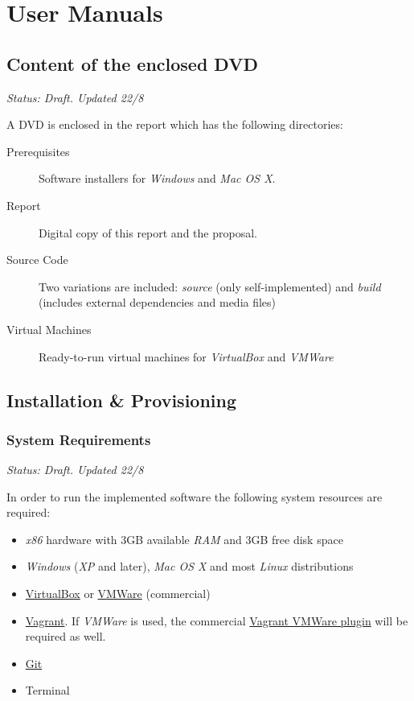 \section{User Manuals}

\subsection{Content of the enclosed DVD}

\emph{Status: Draft. Updated 22/8}

A DVD is enclosed in the report which has the following directories:

\begin{description}
    \item[Prerequisites] Software installers for \emph{Windows} and \emph{Mac OS X}.
    \item[Report] Digital copy of this report and the proposal.
    \item[Source Code] Two variations are included: \emph{source} (only self-implemented) and \emph{build} (includes external dependencies and media files)
    \item[Virtual Machines] Ready-to-run virtual machines for \emph{VirtualBox} and \emph{VMWare}
\end{description}

\subsection{Installation \& Provisioning}

\subsubsection{System Requirements}

\emph{Status: Draft. Updated 22/8}

In order to run the implemented software the following system resources are required:

\begin{itemize}
\item \emph{x86} hardware with 3GB available \emph{RAM} and 3GB free disk space
\item \emph{Windows} (\emph{XP} and later), \emph{Mac OS X} and most \emph{Linux} distributions
\item \href{https://www.virtualbox.org/wiki/Downloads}{VirtualBox} or \href{http://www.vmware.com/products/fusion/}{VMWare} (commercial)
\item \href{http://www.vagrantup.com/downloads.html}{Vagrant}. If \emph{VMWare} is used, the commercial \href{https://www.vagrantup.com/vmware}{Vagrant VMWare plugin} will be required as well.
\item \href{https://git-scm.com/}{Git}
\item Terminal
\end{itemize}

